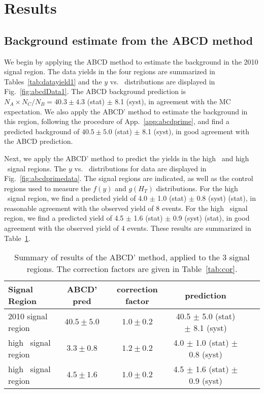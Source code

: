\section{Results}
\label{sec:results}

\subsection{Background estimate from the ABCD method}
\label{sec:abcdres}

We begin by applying the ABCD method to estimate the background in the 2010 signal region.
The data yields in the four regions are summarized in Tables~\ref{tab:datayield1} and
the $y$ vs. \Ht\ distributions are displayed in Fig.~\ref{fig:abcdData1}.
The ABCD background prediction is $N_A \times N_C / N_B = 40.3 \pm 4.3$ (stat) $\pm$ 8.1 (syst), in
agreement with the MC expectation. We also apply the ABCD' method to estimate the
background in this region, following the procedure of App.~\ref{app:abcdprime},
and find a predicted background of $40.5 \pm 5.0$ (stat) $\pm$ 8.1 (syst), in good agreement
with the ABCD prediction.

Next, we apply the ABCD' method to predict the yields in the high \met\ and high \Ht\
signal regions. The $y$ vs. \Ht\ distributions for data are displayed in 
Fig.~\ref{fig:abcdprimedata}. The signal regions are indicated, as well as the control 
regions used to measure the $f(y)$ and $g(H_T)$ distributions. 
For the high \met\ signal region, we find a predicted yield of 
4.0 $\pm$ 1.0 (stat) $\pm$ 0.8 (syst) (stat), in reasonable
agreement with the observed yield of 8 events. 
For the high \met\ signal region, we find a predicted yield of 
4.5 $\pm$ 1.6 (stat) $\pm$ 0.9 (syst) (stat), in good
agreement with the observed yield of 4 events. 
These results are summarized in Table~\ref{tab:abcdprime}.

\begin{table}[hbt]
\begin{center}
\caption{\label{tab:abcdprime} 
Summary of results of the ABCD' method, applied to the 3 signal regions. The correction
factors are given in Table~\ref{tab:cor}.
}
\vspace{.25cm}
\begin{tabular}{lccccc}
\hline
Signal Region             &     ABCD' pred      &  correction factor  &  prediction                                  \\ 
\hline
2010 signal region        &  $40.5 \pm 5.0$     & $1.0 \pm 0.2$      & 40.5 $\pm$ 5.0 (stat) $\pm$ 8.1 (syst)        \\
high \met\ signal region  &  $3.3  \pm 0.8$     & $1.2 \pm 0.2$      &  4.0 $\pm$ 1.0 (stat) $\pm$ 0.8 (syst)        \\
high \Ht\ signal region   &  $4.5  \pm 1.6$     & $1.0 \pm 0.2$      &  4.5 $\pm$ 1.6 (stat) $\pm$ 0.9 (syst)        \\
\hline
\end{tabular}
\end{center}
\end{table}

